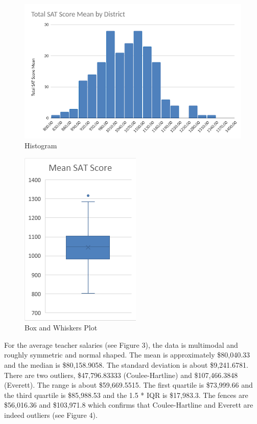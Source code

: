 \documentclass[11pt]{article} %
\begin{document}
\begin{figure}[H]
  \includegraphics[scale=0.5,center]{figure1.png}
  \caption{Histogram}
  \label{fig:fig1}
\end{figure}
\begin{figure}[H]
  \includegraphics[scale=0.5,center]{figure2.png}
  \caption{Box and Whiskers Plot}
  \label{fig:fig2}
\end{figure}

For the average teacher salaries (see Figure 3), the data is multimodal and roughly symmetric and normal shaped. The mean is approximately \$80,040.33 and the median is \$80,158.9058. The standard deviation is about \$9,241.6781. There are two outliers, \$47,796.83333 (Coulee-Hartline) and \$107,466.3848 (Everett). The range is about \$59,669.5515. The first quartile is \$73,999.66 and the third quartile is \$85,988.53 and the 1.5 * IQR is \$17,983.3. The fences are \$56,016.36 and \$103,971.8 which confirms that Coulee-Hartline and Everett are indeed outliers (see Figure 4).
\end{document}
